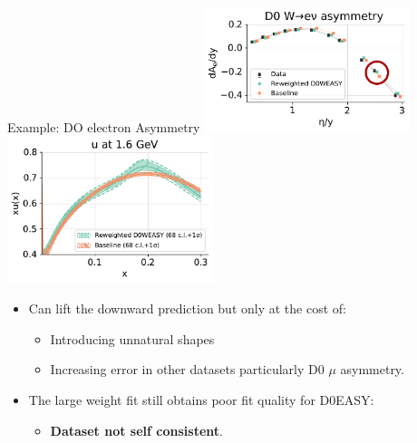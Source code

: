 \begin{frame}{Example: DO electron Asymmetry}
\includegraphics[width=0.45\textwidth,height=0.26\textwidth]{weight_fits/plots/D0WEASY_Norm1_plot_fancy_0.pdf}
\includegraphics[width=0.45\textwidth,height=0.26\textwidth]{weight_fits/plots/plot_pdfs_u.pdf}
\normalsize


\vspace{-1em}

\begin{itemize}
\tightlist
\item
  Can lift the downward prediction but only at the cost of:

  \begin{itemize}
  \tightlist
  \item
    Introducing unnatural shapes
  \item
    Increasing error in other datasets particularly D0 \(\mu\)
    asymmetry.
  \end{itemize}
\item
  The large weight fit still obtains poor fit quality for D0EASY:

  \begin{itemize}
  \tightlist
  \item
    \textbf{Dataset not self consistent}.
  \end{itemize}
\end{itemize}
\end{frame}
